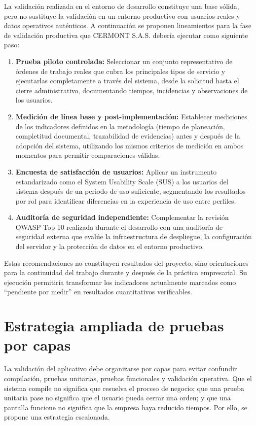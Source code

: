 La validación realizada en el entorno de desarrollo constituye una base sólida, pero no sustituye la validación en un entorno productivo con usuarios reales y datos operativos auténticos. A continuación se proponen lineamientos para la fase de validación productiva que CERMONT S.A.S. debería ejecutar como siguiente paso:

\begin{enumerate}
    \item \textbf{Prueba piloto controlada:} Seleccionar un conjunto representativo de órdenes de trabajo reales que cubra los principales tipos de servicio y ejecutarlas completamente a través del sistema, desde la solicitud hasta el cierre administrativo, documentando tiempos, incidencias y observaciones de los usuarios.
    \item \textbf{Medición de línea base y post-implementación:} Establecer mediciones de los indicadores definidos en la metodología (tiempo de planeación, completitud documental, trazabilidad de evidencias) antes y después de la adopción del sistema, utilizando los mismos criterios de medición en ambos momentos para permitir comparaciones válidas.
    \item \textbf{Encuesta de satisfacción de usuarios:} Aplicar un instrumento estandarizado como el System Usability Scale (SUS) a los usuarios del sistema después de un periodo de uso suficiente, segmentando los resultados por rol para identificar diferencias en la experiencia de uso entre perfiles.
    \item \textbf{Auditoría de seguridad independiente:} Complementar la revisión OWASP Top 10 realizada durante el desarrollo con una auditoría de seguridad externa que evalúe la infraestructura de despliegue, la configuración del servidor y la protección de datos en el entorno productivo.
\end{enumerate}

Estas recomendaciones no constituyen resultados del proyecto, sino orientaciones para la continuidad del trabajo durante y después de la práctica empresarial. Su ejecución permitiría transformar los indicadores actualmente marcados como ``pendiente por medir'' en resultados cuantitativos verificables.

\section{Estrategia ampliada de pruebas por capas}
\label{sec:estrategia-ampliada-pruebas-capas}

La validación del aplicativo debe organizarse por capas para evitar confundir compilación, pruebas unitarias, pruebas funcionales y validación operativa. Que el sistema compile no significa que resuelva el proceso de negocio; que una prueba unitaria pase no significa que el usuario pueda cerrar una orden; y que una pantalla funcione no significa que la empresa haya reducido tiempos. Por ello, se propone una estrategia escalonada.

